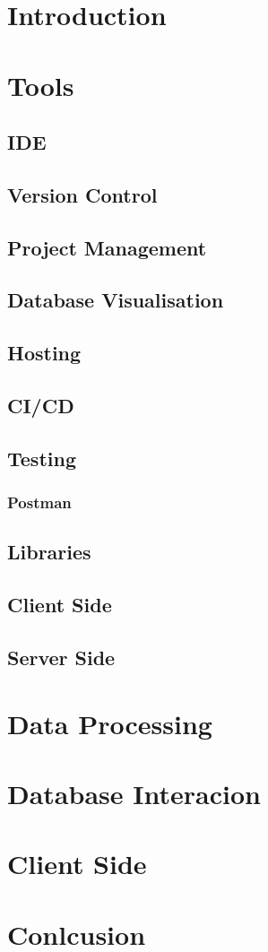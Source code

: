 \section{Introduction}
\section{Tools}
\subsection{IDE}
\subsection{Version Control}
\subsection{Project Management}
\subsection{Database Visualisation}
\subsection{Hosting}
\subsection{CI/CD}
\subsection{Testing}
\subsubsection{Postman}
\subsection{Libraries}
\subsection{Client Side}
\subsection{Server Side}
\section{Data Processing}
\section{Database Interacion}
\section{Client Side}
\section{Conlcusion}